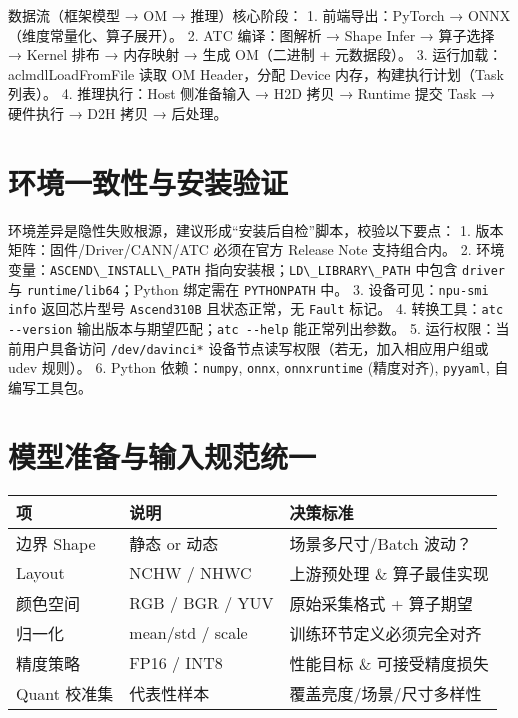 数据流（框架模型 → OM → 推理）核心阶段： 1. 前端导出：PyTorch →
ONNX（维度常量化、算子展开）。 2. ATC 编译：图解析 → Shape Infer →
算子选择 → Kernel 排布 → 内存映射 → 生成 OM（二进制 + 元数据段）。 3.
运行加载：aclmdlLoadFromFile 读取 OM Header，分配 Device
内存，构建执行计划（Task 列表）。 4. 推理执行：Host 侧准备输入 → H2D
拷贝 → Runtime 提交 Task → 硬件执行 → D2H 拷贝 → 后处理。

\section{环境一致性与安装验证}\label{ux73afux5883ux4e00ux81f4ux6027ux4e0eux5b89ux88c5ux9a8cux8bc1}

环境差异是隐性失败根源，建议形成``安装后自检''脚本，校验以下要点： 1.
版本矩阵：固件/Driver/CANN/ATC 必须在官方 Release Note 支持组合内。 2.
环境变量：\passthrough{\lstinline!ASCEND\_INSTALL\_PATH!}
指向安装根；\passthrough{\lstinline!LD\_LIBRARY\_PATH!} 中包含
\passthrough{\lstinline!driver!} 与
\passthrough{\lstinline!runtime/lib64!}；Python 绑定需在
\passthrough{\lstinline!PYTHONPATH!} 中。 3.
设备可见：\passthrough{\lstinline!npu-smi info!} 返回芯片型号
\passthrough{\lstinline!Ascend310B!} 且状态正常，无
\passthrough{\lstinline!Fault!} 标记。 4.
转换工具：\passthrough{\lstinline!atc --version!}
输出版本与期望匹配；\passthrough{\lstinline!atc --help!}
能正常列出参数。 5. 运行权限：当前用户具备访问
\passthrough{\lstinline!/dev/davinci*!}
设备节点读写权限（若无，加入相应用户组或 udev 规则）。 6. Python
依赖：\passthrough{\lstinline!numpy!}, \passthrough{\lstinline!onnx!},
\passthrough{\lstinline!onnxruntime!} (精度对齐),
\passthrough{\lstinline!pyyaml!}, 自编写工具包。

\section{模型准备与输入规范统一}\label{ux6a21ux578bux51c6ux5907ux4e0eux8f93ux5165ux89c4ux8303ux7edfux4e00}

\begin{longtable}[]{@{}lll@{}}
\toprule\noalign{}
项 & 说明 & 决策标准 \\
\midrule\noalign{}
\endhead
\bottomrule\noalign{}
\endlastfoot
边界 Shape & 静态 or 动态 & 场景多尺寸/Batch 波动？ \\
Layout & NCHW / NHWC & 上游预处理 \& 算子最佳实现 \\
颜色空间 & RGB / BGR / YUV & 原始采集格式 + 算子期望 \\
归一化 & mean/std / scale & 训练环节定义必须完全对齐 \\
精度策略 & FP16 / INT8 & 性能目标 \& 可接受精度损失 \\
Quant 校准集 & 代表性样本 & 覆盖亮度/场景/尺寸多样性 \\
\end{longtable}

